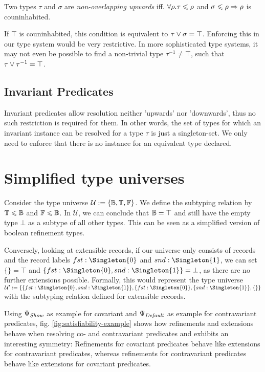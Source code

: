 \begin{definition}
  Two types $\tau$ and $\sigma$ are \emph{non-overlapping upwards} iff. $\forall\rho. \tau \leqslant \rho$ and $\sigma \leqslant \rho \Rightarrow \rho$ is couninhabited.
\end{definition}

If $\top$ is couninhabited, this condition is equivalent to $\tau \vee \sigma = \top$.
Enforcing this in our type system would be very restrictive.
In more sophisticated type systems, it may not even be possible to find a non-trivial type $\tau^{-1} \neq \top$, such that $\tau \vee \tau^{-1} = \top$.


\subsection{Invariant Predicates}

Invariant predicates allow resolution neither 'upwards' nor 'downwards', thus no such restriction is required for them.
In other words, the set of types for which an invariant instance can be resolved for a type $\tau$ is just a singleton-set.
We only need to enforce that there is no instance for an equivalent type declared.



\section{Simplified type universes}

Consider the type universe $\mathcal{U} := \{ \mathbb{B}, \mathbb{T}, \mathbb{F} \}$.
We define the subtyping relation by $\mathbb{T} \leqslant \mathbb{B}$ and $\mathbb{F} \leqslant \mathbb{B}$.
In $\mathcal{U}$, we can conclude that $\mathbb{B} = \top$ and still have the empty type $\bot$ as a subtype of all other types.
This can be seen as a simplified version of boolean refinement types. \cite{springer}

Conversely, looking at extensible records, if our universe only consists of records and the record labels $fst : \Singleton{0}$ and $snd : \Singleton{1}$, we can set $\{\} = \top$ and $\{ fst : \Singleton{0}, snd : \Singleton{1} \} = \bot$, as there are no further extensions possible.
Formally, this would represent the type universe $\mathcal{U}' := \{ \{ fst : \Singleton{0}, snd : \Singleton{1} \}, \{ fst : \Singleton{0} \}, \{ snd : \Singleton{1} \}, \{\} \}$ with the subtyping relation defined for extensible records. %

Using $\Psi_\mathit{Show}$ as example for covariant and $\Psi_\mathit{Default}$ as example for contravariant predicates, fig. \ref{fig:satisfiability-example} shows how refinements and extensions behave when resolving co- and contravariant predicates and exhibits an interesting symmetry:
Refinements for covariant predicates behave like extensions for contravariant predicates, whereas refinements for contravariant predicates behave like extensions for covariant predicates.


